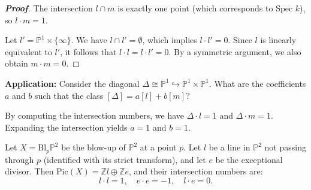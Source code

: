 \begin{proof}[\textbf{Proof}]
The intersection $l \cap m$ is exactly one point (which corresponds to $\text{Spec } k$), so $l \cdot m = 1$. 

Let $l' = \mathbb{P}^1 \times \{\infty\}$. We have $l \cap l' = \emptyset$, which implies $l \cdot l' = 0$. Since $l$ is linearly equivalent to $l'$, it follows that $l \cdot l = l \cdot l' = 0$. By a symmetric argument, we also obtain $m \cdot m = 0$.
\end{proof}

\textbf{Application:} Consider the diagonal $\Delta \cong \mathbb{P}^1 \hookrightarrow \mathbb{P}^1 \times \mathbb{P}^1$. What are the coefficients $a$ and $b$ such that the class $[\Delta] = a[l] + b[m]$?

By computing the intersection numbers, we have $\Delta \cdot l = 1$ and $\Delta \cdot m = 1$. Expanding the intersection yields $a = 1$ and $b = 1$.

\begin{theorem}[20.2.D]
Let $X = \text{Bl}_p \mathbb{P}^2$ be the blow-up of $\mathbb{P}^2$ at a point $p$. Let $l$ be a line in $\mathbb{P}^2$ not passing through $p$ (identified with its strict transform), and let $e$ be the exceptional divisor. Then $\text{Pic}(X) = \mathbb{Z} l \oplus \mathbb{Z} e$, and their intersection numbers are:
\[
l \cdot l = 1, \quad e \cdot e = -1, \quad l \cdot e = 0.
\]
\end{theorem}

